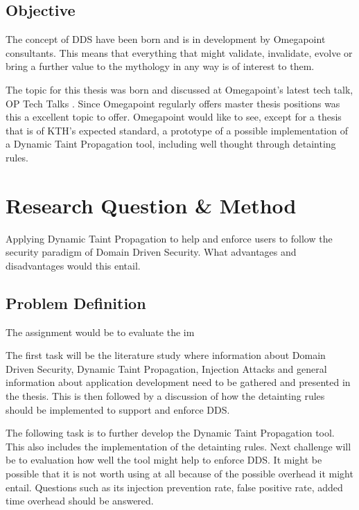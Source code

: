 \documentclass{../kththesis}
\begin{document}
\section{Objective}
The concept of DDS have been born and is in development by Omegapoint consultants. This means that everything that might validate, invalidate, evolve or bring a further value to the mythology in any way is of interest to them. 

The topic for this thesis was born and discussed at Omegapoint's latest tech talk, OP Tech Talks \parencite{Tardell}. Since Omegapoint regularly offers master thesis positions was this a excellent topic to offer. Omegapoint would like to see, except for a thesis that is of KTH's expected standard, a prototype of a possible implementation of a Dynamic Taint Propagation tool, including well thought through detainting rules.



\chapter{Research Question \& Method}
Applying Dynamic Taint Propagation to help and enforce users to follow the security paradigm of Domain Driven Security. What advantages and disadvantages would this entail.


\section{Problem Definition}
The assignment would be to evaluate the im

The first task will be the literature study where information about Domain Driven Security, Dynamic Taint Propagation, Injection Attacks and general information about application development need to be gathered and presented in the thesis. This is then followed by a discussion of how the detainting rules should be implemented to support and enforce DDS. 

The following task is to further develop the Dynamic Taint Propagation tool. This also includes the implementation of the detainting rules. Next challenge will be to evaluation how well the tool might help to enforce DDS. It might be possible that it is not worth using at all because of the possible overhead it might entail. Questions such as its injection prevention rate, false positive rate, added time overhead should be answered.
\end{document}
